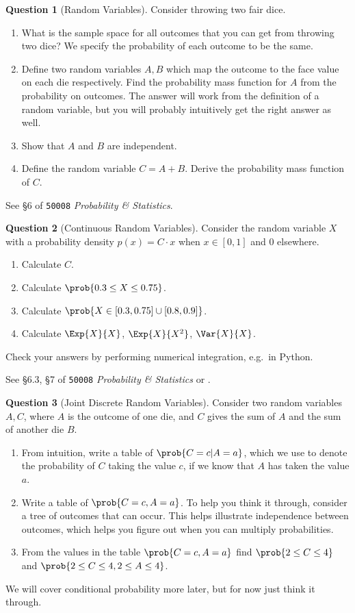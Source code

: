 \documentclass[a4paper]{article}
\theoremstyle{definition}
\newtheorem{question}{Question}
\newcommand{\courseprobstats}{\texttt{50008} \textit{Probability \& Statistics}}
\begin{document}
\begin{question}[Random Variables]
\label{q:rv}
Consider throwing two fair dice.
\begin{enumerate}[label=\alph*.]
    \item What is the sample space for all outcomes that you can get from throwing two dice? We specify the probability of each outcome to be the same.
    \item Define two random variables $A,B$ which map the outcome to the face value on each die respectively. Find the probability mass function for $A$ from the probability on outcomes. The answer will work from the definition of a random variable, but you will probably intuitively get the right answer as well.
    \item Show that $A$ and $B$ are independent.
    \item Define the random variable $C = A + B$. Derive the probability mass function of $C$.
\end{enumerate}
See \S6 of \courseprobstats{}.
\end{question}


\begin{question}[Continuous Random Variables]
Consider the random variable $X$ with a probability density $p(x) = C\cdot x$ when $x \in [0, 1]$ and $0$ elsewhere.
\begin{enumerate}[label=\alph*.]
    \item Calculate $C$.
    \item Calculate $\prob{0.3 \leq X \leq 0.75}$.
    \item Calculate $\prob{X \in [0.3, 0.75] \cup [0.8, 0.9]}$.
    \item Calculate $\Exp{X}{X}$, $\Exp{X}{X^2}$, $\Var{X}{X}$.
\end{enumerate}
Check your answers by performing numerical integration, e.g.~in Python.

See \S6.3, \S7 of \courseprobstats{} or \citet[\S 6.2.2]{mml}.
\end{question}


\begin{question}[Joint Discrete Random Variables]
Consider two random variables $A,C$, where $A$ is the outcome of one die, and $C$ gives the sum of $A$ and the sum of another die $B$.
\begin{enumerate}[label=\alph*.]
    \item From intuition, write a table of $\prob{C=c|A=a}$, which we use to denote the probability of $C$ taking the value $c$, if we know that $A$ has taken the value $a$.
    \item Write a table of $\prob{C=c, A=a}$. To help you think it through, consider a tree of outcomes that can occur. This helps illustrate independence between outcomes, which helps you figure out when you can multiply probabilities.
    \item From the values in the table $\prob{C=c, A=a}$ find $\prob{2 \leq C \leq 4}$ and $\prob{2 \leq C \leq 4, 2 \leq A \leq 4}$.
\end{enumerate}
We will cover conditional probability more later, but for now just think it through.
\end{question}
\end{document}
